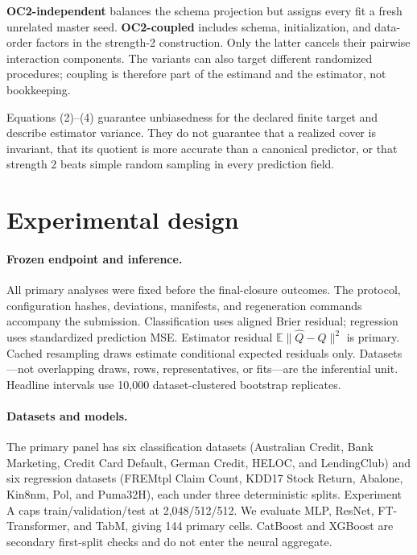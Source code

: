 \documentclass{article}
\newcommand{\E}{\mathbb{E}}
\newcommand{\Qhat}{\widehat{Q}}
\begin{document}
\textbf{OC2-independent} balances the schema projection but assigns every fit
a fresh unrelated master seed. \textbf{OC2-coupled} includes schema,
initialization, and data-order factors in the strength-2 construction. Only
the latter cancels their pairwise interaction components. The variants can
also target different randomized procedures; coupling is therefore part of
the estimand and the estimator, not bookkeeping.

Equations (2)--(4) guarantee unbiasedness for the declared finite target and
describe estimator variance. They do not guarantee that a realized cover is
invariant, that its quotient is more accurate than a canonical predictor, or
that strength 2 beats simple random sampling in every prediction field.

\section{Experimental design}
\label{sec:experiments}

\paragraph{Frozen endpoint and inference.}
All primary analyses were fixed before the final-closure outcomes. The
protocol, configuration hashes, deviations, manifests, and regeneration
commands accompany the submission. Classification uses aligned Brier
residual; regression uses standardized prediction MSE. Estimator residual
$\E\lVert\Qhat-Q\rVert^2$ is primary. Cached resampling draws estimate
conditional expected residuals only. Datasets---not overlapping draws, rows,
representatives, or fits---are the inferential unit. Headline intervals use
10,000 dataset-clustered bootstrap replicates.

\paragraph{Datasets and models.}
The primary panel has six classification datasets (Australian Credit, Bank
Marketing, Credit Card Default, German Credit, HELOC, and LendingClub) and six
regression datasets (FREMtpl Claim Count, KDD17 Stock Return, Abalone, Kin8nm,
Pol, and Puma32H), each under three deterministic splits. Experiment A caps
train/validation/test at 2,048/512/512. We evaluate MLP, ResNet,
FT-Transformer, and TabM, giving 144 primary cells. CatBoost and XGBoost are
secondary first-split checks and do not enter the neural aggregate.
\end{document}
